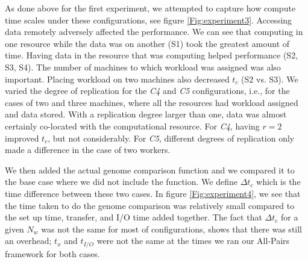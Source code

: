 \documentclass{rspublic}
\begin{document}
As done above for the first experiment, we attempted to capture how
compute time scales under these configurations, see figure
\ref{Fig:experiment3}. Accessing data remotely adversely affected the
performance. We can see that computing in one resource while the data
was on another (S1) took the greatest amount of time. Having data in the
resource that was computing helped performance (S2, S3, S4). The number
of machines to which workload was assigned was also important. Placing
workload on two machines also decreased $t_c$ (S2 vs. S3). We varied the
degree of replication for the \textit{C4} and \textit{C5} configurations, i.e., for
the cases of two and three machines, where all the resources had
workload assigned and data stored. With a replication degree larger than
one, data was almost certainly co-located with the computational
resource. For \textit{C4}, having $r = 2$ improved $t_c$, but not considerably.
For \textit{C5}, different degrees of replication only made a difference in the
case of two workers.

We then added the actual genome comparison function and we compared it
to the base case where we did not include the function. We define $\Delta t_c$
which is the time difference between these two cases. In figure
\ref{Fig:experiment4}, we see that the time taken to do the genome
comparison was relatively small compared to the set up time, transfer,
and I/O time added together. The fact that $\Delta t_c$ for a given
$N_w$ was not the same for most of configurations, shows that there was
still an overhead; $t_x$ and $t_{I/O}$ were not the same at the
times we ran our All-Pairs framework for both cases.
\end{document}
